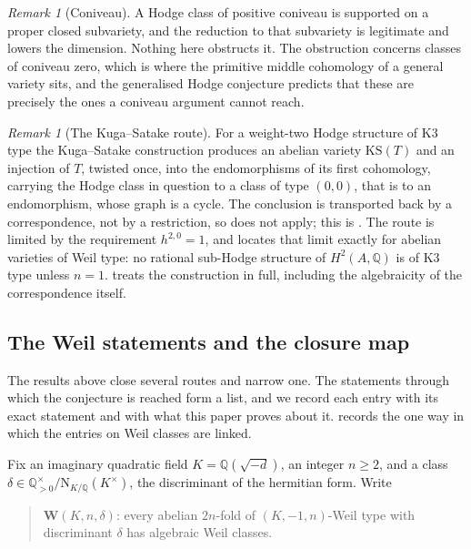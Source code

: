 \documentclass[11pt,reqno]{amsart}
\theoremstyle{plain}
\theoremstyle{definition}
\theoremstyle{remark}
\newtheorem{remark}[theorem]{Remark}
\newcommand{\QQ}{\mathbb{Q}}
\newcommand{\Nm}{\mathrm{N}}             %
\newcommand{\Kx}{K^{\times}}
\begin{document}
\begin{remark}[Coniveau]\label{rem:coniveauscope}
A Hodge class of positive coniveau is supported on a proper closed
subvariety, and the reduction to that subvariety is legitimate and lowers the
dimension. Nothing here obstructs it. The obstruction concerns classes of
coniveau zero, which is where the primitive middle cohomology of a general
variety sits, and the generalised Hodge conjecture predicts that these are
precisely the ones a coniveau argument cannot reach.
\end{remark}

\begin{remark}[The Kuga--Satake route]\label{rem:ksscope}
For a weight-two Hodge structure of K3 type the Kuga--Satake construction
produces an abelian variety $\mathrm{KS}(T)$ and an injection of $T$, twisted
once, into the endomorphisms of its first cohomology, carrying the Hodge class
in question to a class of type $(0,0)$, that is to an endomorphism, whose graph
is a cycle. The conclusion is transported back by a correspondence, not by a
restriction, so \cite[Theorem~10.3]{paperI} does not apply; this is
\cite[Proposition~11.9]{paperI}. The route is limited by the requirement
$h^{2,0}=1$, and \cite[Proposition~11.11]{paperI} locates that limit exactly for abelian
varieties of Weil type: no rational sub-Hodge structure of $H^{2}(A,\QQ)$ is of
K3 type unless $n=1$. \cite[Section~11]{paperI} treats the construction in full, including
the algebraicity of the correspondence itself.
\end{remark}

\subsection{The Weil statements and the closure map}
\label{ssec:closuremap}

The results above close several routes and narrow one. The statements
through which the conjecture is reached form a list, and we record each
entry with its exact statement and with what this paper proves about it.
 records the one way in which the entries on Weil classes
are linked.

Fix an imaginary quadratic field $K=\QQ(\sqrt{-d})$, an integer $n\ge2$, and a
class $\delta\in\QQ^{\times}_{>0}/\Nm_{K/\QQ}(\Kx)$, the discriminant of the
hermitian form. Write
\begin{quote}
$\mathbf{W}(K,n,\delta)$: every abelian $2n$-fold of $(K,-1,n)$-Weil type with
discriminant $\delta$ has algebraic Weil classes.
\end{quote}
\end{document}
